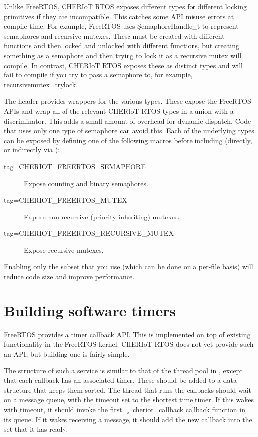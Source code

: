 Unlike FreeRTOS, CHERIoT RTOS exposes different types for different locking primitives if they are incompatible.
This catches some API misuse errors at compile time.
For example, FreeRTOS uses \c{SemaphoreHandle_t} to represent semaphores and recursive mutexes.
These must be created with different functions and then locked and unlocked with different functions, but creating something as a semaphore and then trying to lock it as a recursive mutex will compile.
In contrast, CHERIoT RTOS exposes these as distinct types and will fail to compile if you try to pass a semaphore to, for example, \c{recursivemutex_trylock}.

The  header provides wrappers for the various types.
These expose the FreeRTOS APIs and wrap all of the relevant CHERIoT RTOS types in a union with a discriminator.
This adds a small amount of overhead for dynamic dispatch. 
Code that uses only one type of semaphore can avoid this.
Each of the underlying types can be exposed by defining one of the following macros before including  (directly, or indirectly via ):

\begin{description}
	\item[tag=CHERIOT_FREERTOS_SEMAPHORE]{ Expose counting and binary semaphores.}
	\item[tag=CHERIOT_FREERTOS_MUTEX]{ Expose non-recursive (priority-inheriting) mutexes.}
	\item[tag=CHERIOT_FREERTOS_RECURSIVE_MUTEX]{ Expose recursive mutexes.}
\end{description}

Enabling only the subset that you use (which can be done on a per-file basis) will reduce code size and improve performance.

\section{Building software timers}

FreeRTOS provides a timer callback API.
This is implemented on top of existing functionality in the FreeRTOS kernel.
CHERIoT RTOS does not yet provide such an API, but building one is fairly simple.

The structure of such a service is similar to that of the thread pool in , except that each callback has an associated timer.
These should be added to a data structure that keeps them sorted.
The thread that runs the callbacks should wait on a message queue, with the timeout set to the shortest time timer.
If this wakes with timeout, it should invoke the first \c{__cheriot_callback} callback function in its queue.
If it wakes receiving a message, it should add the new callback into the set that it has ready.

